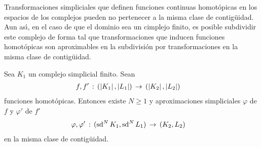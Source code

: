 Transformaciones simpliciales que definen funciones continuas homot\'{o}picas
en los espacios de los complejos pueden no pertenecer a la misma clase de
contig\"{u}idad. Aun as\'{\i}, en el caso de que el dominio sea un cimplejo
finito, es posible subdividir este complejo de forma tal que transformaciones
que inducen funciones homot\'{o}picas son aproximables en la subdivisi\'{o}n
por transformaciones en la misma clase de contig\"{u}idad.

\begin{teoHomotopicasAdmitenAproximacionesContiguas}%
	\label{thm:homotopicasadmitenaproximacionescontiguas}
	Sea $K_{1}$ un complejo simplicial finito. Sean
	\begin{align*}
		f,f' & \,:\,(\geom{K_{1}},\geom{L_{1}})\,\rightarrow\,
			(\geom{K_{2}},\geom{L_{2}})
	\end{align*}
	funciones homot\'{o}picas. Entonces existe $N\geq 1$ y aproximaciones
	simpliciales $\varphi$ de $f$ y $\varphi'$ de $f'$
	\begin{align*}
		\varphi,\varphi' & \,:\,(\subdiv[N]{K_{1}},\subdiv[N]{L_{1}})
			\,\rightarrow\,(K_{2},L_{2})
	\end{align*}
	en la misma clase de contig\"{u}idad.
\end{teoHomotopicasAdmitenAproximacionesContiguas}

